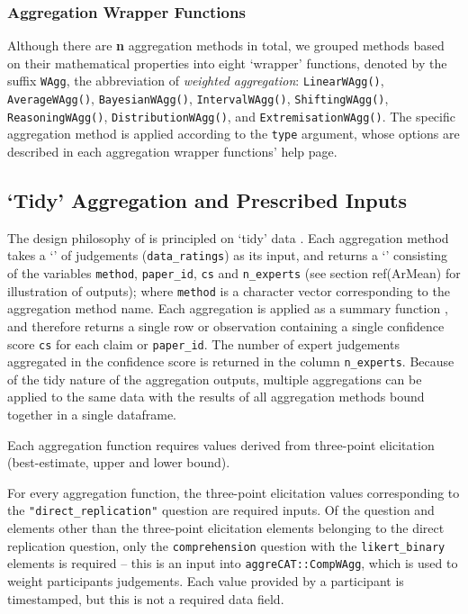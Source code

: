\documentclass[article]{jss}
\newcommand{\class}[1]{`\code{#1}'}
\begin{document}
\hypertarget{aggregation-wrapper-functions}{%
\subsubsection{Aggregation Wrapper
Functions}\label{aggregation-wrapper-functions}}

Although there are \textbf{n} aggregation methods in total, we grouped
methods based on their mathematical properties into eight `wrapper'
functions, denoted by the suffix \texttt{WAgg}, the abbreviation of
\emph{weighted aggregation}: \texttt{LinearWAgg()},
\texttt{AverageWAgg()}, \texttt{BayesianWAgg()},
\texttt{IntervalWAgg()}, \texttt{ShiftingWAgg()},
\texttt{ReasoningWAgg()}, \texttt{DistributionWAgg()}, and
\texttt{ExtremisationWAgg()}. The specific aggregation method is applied
according to the \texttt{type} argument, whose options are described in
each aggregation wrapper functions' help page.

\hypertarget{tidy-aggregation-and-prescribed-inputs}{%
\subsection{`Tidy' Aggregation and Prescribed
Inputs}\label{tidy-aggregation-and-prescribed-inputs}}

The design philosophy of  is principled on `tidy' data
\citep{Wickham:2014vp}. Each aggregation method takes a \class{tibble}
of judgements (\texttt{data\_ratings}) as its input, and returns a
\class{tibble} consisting of the variables \texttt{method},
\texttt{paper\_id}, \texttt{cs} and \texttt{n\_experts} (see section
ref(ArMean) for illustration of outputs); where \texttt{method} is a
character vector corresponding to the aggregation method name. Each
aggregation is applied as a summary function \citep{Wickham2017R}, and
therefore returns a single row or observation containing a single
confidence score \texttt{cs} for each claim or \texttt{paper\_id}. The
number of expert judgements aggregated in the confidence score is
returned in the column \texttt{n\_experts}. Because of the tidy nature
of the aggregation outputs, multiple aggregations can be applied to the
same data with the results of all aggregation methods bound together in
a single dataframe.

Each aggregation function requires values derived from three-point
elicitation (best-estimate, upper and lower bound).

For every aggregation function, the three-point elicitation values
corresponding to the \texttt{"direct\_replication"} question are
required inputs. Of the question and elements other than the three-point
elicitation elements belonging to the direct replication question, only
the \texttt{comprehension} question with the \texttt{likert\_binary}
elements is required -- this is an input into
\texttt{aggreCAT::CompWAgg}, which is used to weight participants
judgements. Each value provided by a participant is timestamped, but
this is not a required data field.
\end{document}
